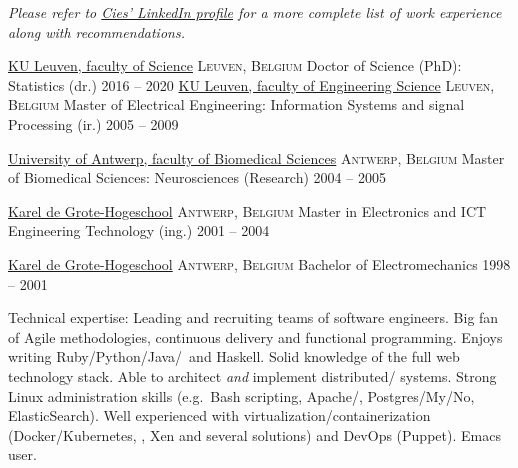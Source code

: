 \documentclass[10pt,a4paper]{article}
\begin{document}
\vspace{-0.2em}
\begin{center}
  \emph{\small Please refer to \href{http://www.linkedin.com/in/ciesbreijs}{Cies' LinkedIn profile} for a more complete list of work experience along with recommendations.}
\end{center}


\spacedhrule{-0.2em}{-0.4em}


\headedsection
  {\href{https://wet.kuleuven.be/english}{KU Leuven, faculty of Science}}
  {\textsc{Leuven, Belgium}} {%
  \headedsubsection
    {Doctor of Science (PhD): Statistics (dr.) %
    }
    {2016 -- 2020}{}
}
\vspace{+0.2em}
\headedsection
  {\href{https://eng.kuleuven.be/en}{KU Leuven, faculty of Engineering Science}}
  {\textsc{Leuven, Belgium}} {%
  \headedsubsection
    {Master of Electrical Engineering: Information Systems and signal Processing (ir.)}
    {2005 -- 2009} {}
}

\vspace{+0.2em}
\headedsection
  {\href{https://www.uantwerpen.be/en/}{University of Antwerp, faculty of Biomedical Sciences}}
  {\textsc{Antwerp, Belgium}} {%
  \headedsubsection
    {Master of Biomedical Sciences: Neurosciences (Research)}
    {2004 -- 2005} {}
}

\vspace{+0.2em}
\headedsection
{\href{https://www.kdg.be/}{Karel de Grote-Hogeschool}}
{\textsc{Antwerp, Belgium}} {%
	\headedsubsection
	{Master in Electronics and ICT Engineering Technology (ing.)}
	{2001 -- 2004} {}
}

\vspace{+0.2em}
\headedsection
{\href{https://www.kdg.be/}{Karel de Grote-Hogeschool}}
{\textsc{Antwerp, Belgium}} {%
	\headedsubsection
	{Bachelor of Electromechanics}
	{1998 -- 2001} {}
}

\spacedhrule{0.5em}{-0.4em}


\inlineheadsection  %
  {Technical expertise:}
  {Leading and recruiting teams of software engineers.  Big fan of Agile methodologies, continuous delivery and functional programming.  Enjoys writing Ruby/\nsp Python/\nsp Java/\nsp \CPP~and Haskell.  Solid knowledge of the full web technology stack.  Able to architect \textit{and} implement distributed/ systems.  Strong Linux administration skills (e.g.\ Bash scripting, Apache/, Postgres/My/No, ElasticSearch).  Well experienced with virtualization/containerization (Docker/Kubernetes, , Xen and several  solutions) and DevOps (Puppet).  Emacs user.}
\end{document}
